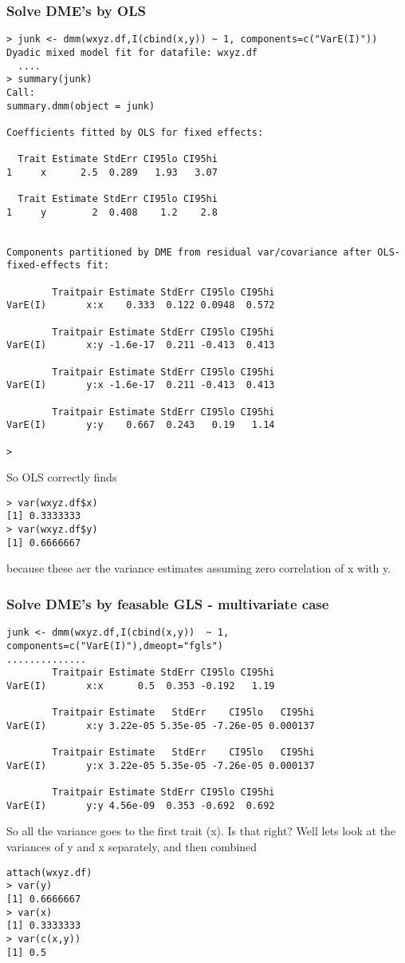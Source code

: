 \documentclass{report}  %
\begin{document}
\subsubsection{Solve DME's by OLS}
\begin{verbatim}
> junk <- dmm(wxyz.df,I(cbind(x,y)) ~ 1, components=c("VarE(I)"))
Dyadic mixed model fit for datafile: wxyz.df  
  ....
> summary(junk)
Call:
summary.dmm(object = junk)

Coefficients fitted by OLS for fixed effects:

  Trait Estimate StdErr CI95lo CI95hi
1     x      2.5  0.289   1.93   3.07

  Trait Estimate StdErr CI95lo CI95hi
1     y        2  0.408    1.2    2.8


Components partitioned by DME from residual var/covariance after OLS-fixed-effects fit:

        Traitpair Estimate StdErr CI95lo CI95hi
VarE(I)       x:x    0.333  0.122 0.0948  0.572

        Traitpair Estimate StdErr CI95lo CI95hi
VarE(I)       x:y -1.6e-17  0.211 -0.413  0.413

        Traitpair Estimate StdErr CI95lo CI95hi
VarE(I)       y:x -1.6e-17  0.211 -0.413  0.413

        Traitpair Estimate StdErr CI95lo CI95hi
VarE(I)       y:y    0.667  0.243   0.19   1.14

> 
\end{verbatim}
So OLS correctly finds
\begin{verbatim}
> var(wxyz.df$x)
[1] 0.3333333
> var(wxyz.df$y)
[1] 0.6666667
\end{verbatim}
because these aer the variance estimates assuming zero correlation of x with y.

\subsubsection{Solve DME's by feasable GLS - multivariate case}
\begin{verbatim}
junk <- dmm(wxyz.df,I(cbind(x,y))  ~ 1, components=c("VarE(I)"),dmeopt="fgls")
..............
        Traitpair Estimate StdErr CI95lo CI95hi
VarE(I)       x:x      0.5  0.353 -0.192   1.19

        Traitpair Estimate   StdErr    CI95lo   CI95hi
VarE(I)       x:y 3.22e-05 5.35e-05 -7.26e-05 0.000137

        Traitpair Estimate   StdErr    CI95lo   CI95hi
VarE(I)       y:x 3.22e-05 5.35e-05 -7.26e-05 0.000137

        Traitpair Estimate StdErr CI95lo CI95hi
VarE(I)       y:y 4.56e-09  0.353 -0.692  0.692
\end{verbatim}
  So all the variance goes to the first trait (x). Is that right? Well lets look at the variances of y and x separately, and then combined
\begin{verbatim}
attach(wxyz.df)
> var(y)
[1] 0.6666667
> var(x)
[1] 0.3333333
> var(c(x,y))
[1] 0.5
\end{verbatim}
\end{document}
